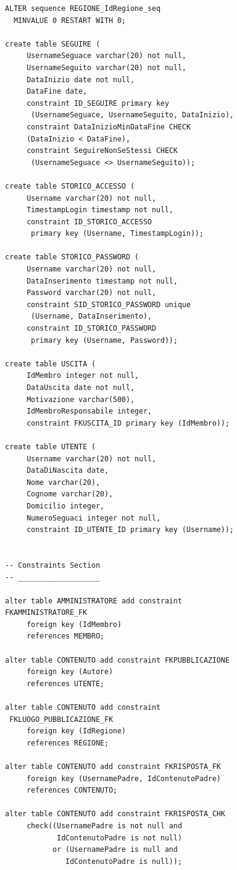 \documentclass[a4paper,12pt]{report}
\begin{document}
\begin{lstlisting}
  ALTER sequence REGIONE_IdRegione_seq 
    MINVALUE 0 RESTART WITH 0;
  
  create table SEGUIRE (
       UsernameSeguace varchar(20) not null,
       UsernameSeguito varchar(20) not null,
       DataInizio date not null,
       DataFine date,
       constraint ID_SEGUIRE primary key 
        (UsernameSeguace, UsernameSeguito, DataInizio),
       constraint DataInizioMinDataFine CHECK 
       (DataInizio < DataFine),
       constraint SeguireNonSeStessi CHECK 
        (UsernameSeguace <> UsernameSeguito));
        
  create table STORICO_ACCESSO (
       Username varchar(20) not null,
       TimestampLogin timestamp not null,
       constraint ID_STORICO_ACCESSO 
        primary key (Username, TimestampLogin));
  
  create table STORICO_PASSWORD (
       Username varchar(20) not null,
       DataInserimento timestamp not null,
       Password varchar(20) not null,
       constraint SID_STORICO_PASSWORD unique 
        (Username, DataInserimento),
       constraint ID_STORICO_PASSWORD 
        primary key (Username, Password));
  
  create table USCITA (
       IdMembro integer not null,
       DataUscita date not null,
       Motivazione varchar(500),
       IdMembroResponsabile integer,
       constraint FKUSCITA_ID primary key (IdMembro));
  
  create table UTENTE (
       Username varchar(20) not null,
       DataDiNascita date,
       Nome varchar(20),
       Cognome varchar(20),
       Domicilio integer,
       NumeroSeguaci integer not null,
       constraint ID_UTENTE_ID primary key (Username));
  
  
  -- Constraints Section
  -- ___________________ 
  
  alter table AMMINISTRATORE add constraint 
  FKAMMINISTRATORE_FK
       foreign key (IdMembro)
       references MEMBRO;
  
  alter table CONTENUTO add constraint FKPUBBLICAZIONE
       foreign key (Autore)
       references UTENTE;
  
  alter table CONTENUTO add constraint
   FKLUOGO_PUBBLICAZIONE_FK
       foreign key (IdRegione)
       references REGIONE;
  
  alter table CONTENUTO add constraint FKRISPOSTA_FK
       foreign key (UsernamePadre, IdContenutoPadre)
       references CONTENUTO;
  
  alter table CONTENUTO add constraint FKRISPOSTA_CHK
       check((UsernamePadre is not null and 
              IdContenutoPadre is not null)
             or (UsernamePadre is null and
                IdContenutoPadre is null)); 
  

\end{lstlisting}
\end{document}
